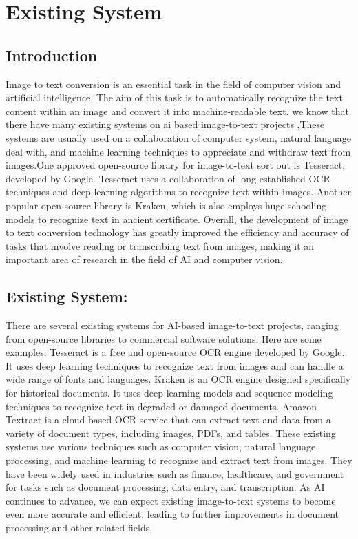 
\section{Existing System}
\subsection{Introduction}
     Image to text conversion is an essential task in the field of computer vision and artificial intelligence. The aim of this task is to automatically recognize the text content within an image and convert it into machine-readable text. we know that there have many  existing systems on ai based image-to-text projects ,These systems are usually  used on a collaboration of computer system, natural language deal with, and machine learning techniques to appreciate and withdraw text from images.One approved open-source library for image-to-text  sort out is Tesseract, developed by Google. Tesseract uses a collaboration   of long-established OCR techniques and deep learning algorithms to recognize text within images. Another popular open-source library is Kraken, which is also employs huge schooling models to recognize text in ancient certificate. Overall, the development of image to text conversion technology has greatly improved the efficiency and accuracy of tasks that involve reading or transcribing text from images, making it an important area of research in the field of AI and computer vision.

\subsection{Existing System:}
There are several existing systems for AI-based image-to-text projects, ranging from open-source libraries to commercial software solutions. Here are some examples:
Tesseract is a free and open-source OCR engine developed by Google. It uses deep learning techniques to recognize text from images and can handle a wide range of fonts and languages. Kraken is an OCR engine designed specifically for historical documents. It uses deep learning models and sequence modeling techniques to recognize text in degraded or damaged documents. Amazon Textract is a cloud-based OCR service that can extract text and data from a variety of document types, including images, PDFs, and tables. These existing systems use various techniques such as computer vision, natural language processing, and machine learning to recognize and extract text from images. They have been widely used in industries such as finance, healthcare, and government for tasks such as document processing, data entry, and transcription. As AI continues to advance, we can expect existing image-to-text systems to become even more accurate and efficient, leading to further improvements in document processing and other related fields.   


